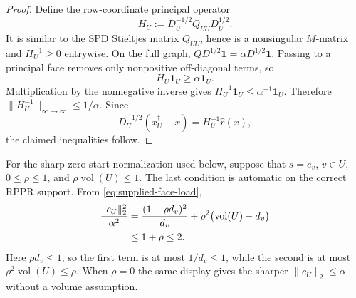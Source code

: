 \begin{proof}
Define the row-coordinate principal operator
\begin{equation*}
 H_U:=D_U^{-1/2}Q_{UU}D_U^{1/2}.
\end{equation*}
It is similar to the SPD Stieltjes matrix $Q_{UU}$, hence is a nonsingular
$M$-matrix and $H_U^{-1}\geq0$ entrywise.  On the full graph,
$QD^{1/2}\mathbf1=\alpha D^{1/2}\mathbf1$.  Passing to a principal face
removes only nonpositive off-diagonal terms, so
\begin{equation*}
 H_U\mathbf1_U\geq\alpha\mathbf1_U.
\end{equation*}
Multiplication by the nonnegative inverse gives
$H_U^{-1}\mathbf1_U\leq\alpha^{-1}\mathbf1_U$.  Therefore
$\|H_U^{-1}\|_{\infty\to\infty}\leq1/\alpha$.  Since
\begin{equation*}
 D_U^{-1/2}(x_U^\dagger-x)=H_U^{-1}\widehat r(x),
\end{equation*}
the claimed inequalities follow.
\end{proof}

For the sharp zero-start normalization used below, suppose that $s=e_v$,
$v\in U$, $0\leq\rho\leq1$, and $\rho\operatorname{vol}(U)\leq1$.  The last
condition is automatic on the correct RPPR support.  From
\eqref{eq:supplied-face-load},
\begin{align}
 \frac{\|c_U\|_2^2}{\alpha^2}
 &=\frac{(1-\rho d_v)^2}{d_v}
   +\rho^2\bigl(\operatorname{vol}(U)-d_v\bigr)\notag\\
 &\leq1+\rho\leq2.
 \label{eq:supplied-face-load-bound}
\end{align}
Here $\rho d_v\leq1$, so the first term is at most $1/d_v\leq1$, while the
second is at most $\rho^2\operatorname{vol}(U)\leq\rho$.  When $\rho=0$ the
same display gives the sharper $\|c_U\|_2\leq\alpha$ without a volume
assumption.

